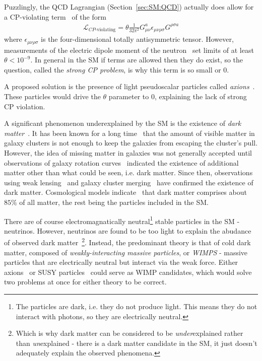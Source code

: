 Puzzlingly, the QCD Lagrangian (Section~\ref{sec:SM:QCD}) actually does allow for a CP-violating term~\cite{Dine:2000cj} of the form
\begin{align}
\mathcal{L}_\text{$CP$-violating} = \theta \frac{1}{32\pi^2}G_{\mu\nu}^a\epsilon_{\mu\nu\rho\sigma}G^{\rho\sigma a}
\end{align}
where $\epsilon_{\mu\nu\rho\sigma}$ is the four-dimensional totally antisymmetric tensor.
However, measurements of the electric dipole moment of the neutron~\cite{Baker:2006ts} set limits of at least $\theta < 10^{-9}$.
In general in the SM if terms are allowed then they do exist, so the question, called the \textit{strong CP problem}, is why this term is so small or $0$.

A proposed solution is the presence of light pseudoscalar particles called \textit{axions}~\cite{Peccei:1977hh,Baluni:1978rf,Crewther:1979pi,Peccei:1977ur,Weinberg:1977ma,Wilczek:1977pj}.
These particles would drive the $\theta$ parameter to $0$, explaining the lack of strong CP violation.

A significant phenomenon underexplained by the SM is the existence of \textit{dark matter}~\cite{Trimble:1987ee,Bertone:2010zza,darkmatter}.
It has been known for a long time~\cite{Zwicky:1937} that the amount of visible matter in galaxy clusters is not enough to keep the galaxies from escaping the cluster's pull.
However, the idea of missing matter in galaxies was not generally accepted until observations of galaxy rotation curves~\cite{rubin:1970,freeman:1970,vanAlbada:1984js} indicated the existence of additional matter other than what could be seen, i.e. dark matter.
Since then, observations using weak lensing~\cite{Clowe:2003tk} and galaxy cluster merging~\cite{Markevitch:2003at} have confirmed the existence of dark matter.
Cosmological models indicate~\cite{Aghanim:2018eyx} that dark matter comprises about $85\%$ of all matter, the rest being the particles included in the SM.

There are of course electromagnatically neutral\footnote{The particles are dark, i.e. they do not produce light. This means they do not interact with photons, so they are electrically neutral.}  stable particles in the SM - neutrinos. However, neutrinos are found to be too light to explain the abudance of observed dark matter~\cite{White:1984yj}\footnote{Which is why dark matter can be considered to be \textit{under}explained rather than \textit{un}explained - there is a dark matter candidate in the SM, it just doesn't adequately explain the observed phenomena.}.
Instead, the predominant theory is that of cold dark matter, composed of \textit{weakly-interacting massive particles}, or \textit{WIMPS} - massive particles that are electrically neutral but interact via the weak force.
Either axions~\cite{Raffelt:1995ym} or SUSY particles~\cite{Jungman:1995df} could serve as WIMP candidates, which would solve two problems at once for either theory to be correct. 

